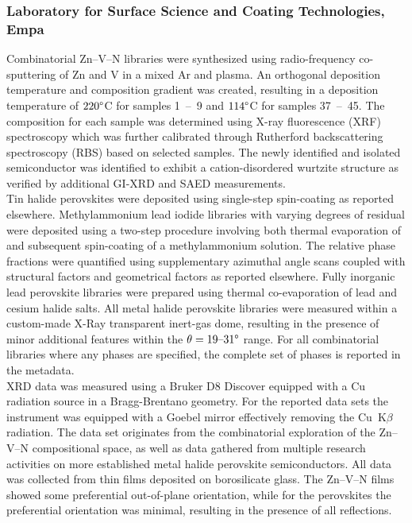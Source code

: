 \subsubsection*{Laboratory for Surface Science and Coating Technologies, Empa}

Combinatorial Zn–V–N libraries were synthesized using radio-frequency co-sputtering of Zn and V in a mixed Ar and  plasma. An orthogonal deposition temperature and composition gradient was created, resulting in a deposition temperature of $220\degree$C for samples 1~–~9 and $114\degree$C for samples 37~–~45. The composition for each sample was determined using X-ray fluorescence (XRF) spectroscopy which was further calibrated through Rutherford backscattering spectroscopy (RBS) based on selected samples. The newly identified and isolated semiconductor  was identified to exhibit a cation-disordered wurtzite structure as verified by additional GI-XRD and SAED measurements\cite{Zhuk2021}. \\
Tin halide perovskites were deposited using single-step spin-coating as reported elsewhere\cite{Wieczorek2023}. Methylammonium lead iodide libraries with varying degrees of residual  were deposited using a two-step procedure involving both thermal evaporation of  and subsequent spin-coating of a methylammonium solution. The relative phase fractions were quantified using supplementary azimuthal angle scans coupled with structural factors and geometrical factors as reported elsewhere\cite{Wieczorek2024}. Fully inorganic lead perovskite libraries were prepared using thermal co-evaporation of lead and cesium halide salts. All metal halide perovskite libraries were measured within a custom-made X-Ray transparent inert-gas dome, resulting in the presence of minor additional features within the $\theta=19 \text{–}31\degree$ range. For all combinatorial libraries where any phases are specified, the complete set of phases is reported in the metadata. \\

XRD data was measured using a Bruker D8 Discover equipped with a Cu radiation source in a Bragg-Brentano geometry. For the reported data sets the instrument was equipped with a Goebel mirror effectively removing the Cu~K$\beta$ radiation. The data set originates from the combinatorial exploration of the Zn–V–N compositional space, as well as data gathered from multiple research activities on more established metal halide perovskite semiconductors. All data was collected from thin films deposited on borosilicate glass. The Zn–V–N films showed some preferential out-of-plane orientation, while for the perovskites the preferential orientation was minimal, resulting in the presence of all reflections. \\

